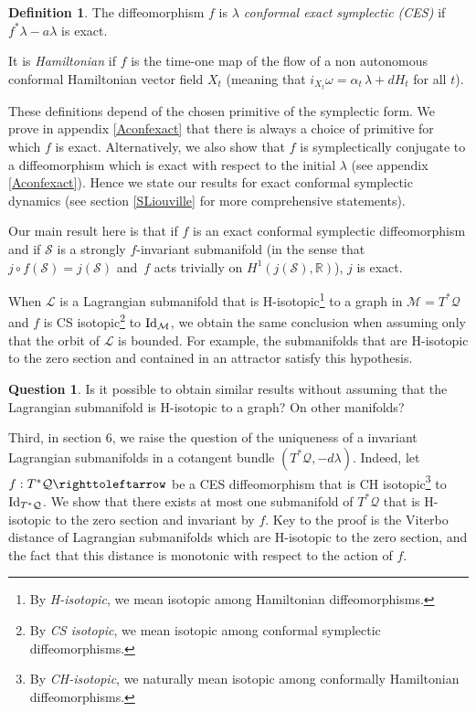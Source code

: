 \documentclass[10pt]{amsart}
\theoremstyle{definition}
\newtheorem{definition}[theorem]{Definition}
\newtheorem*{question*}{Question}
\def\R{\mathbb{R}}
\def\cL{{\mathcal L}}
\def\cM{{\mathcal M}}
\def\cQ{{\mathcal Q}}
\def\cS{{\mathcal S}}
\begin{document}
\begin{definition}
The diffeomorphism $f$ is \emph{$\lambda$ conformal exact symplectic (CES)} if $f^*\lambda-a\lambda$ is exact.

It is \emph{Hamiltonian} if $f$ is the time-one map of the flow of a non autonomous conformal Hamiltonian vector field $X_t$ (meaning that $i_{X_t}\omega = \alpha_t \, \lambda + dH_t$ for all $t$).
\end{definition}

These definitions depend of the chosen primitive of the symplectic form. We prove in appendix \ref{Aconfexact} that there is always a choice of primitive for which $f$ is exact. Alternatively, we also show that $f$ is symplectically conjugate to a diffeomorphism which is exact with respect to the initial $\lambda$ (see appendix \ref{Aconfexact}). Hence we state our results for exact conformal symplectic dynamics (see section \ref{SLiouville} for more comprehensive statements).

Our main result here is that if $f$ is an exact conformal symplectic diffeomorphism and if $\cS$ is a strongly $f$-invariant submanifold (in the sense that $j \circ f (\cS) = j(\cS)$ and~$f$ acts trivially on $H^1(j(\cS),\R)$), $j$ is exact.

When $\cL$ is a Lagrangian submanifold that is H-isotopic\footnote{By \emph{H-isotopic}, we mean isotopic among Hamiltonian diffeomorphisms.} to a graph in $\cM=T^*\cQ$ and $f$ is CS isotopic\footnote{By {\sl CS isotopic}, we mean isotopic among conformal symplectic diffeomorphisms.} to ${\rm Id}_\cM$, we obtain the same conclusion when assuming only that the orbit of $\cL$ is bounded. For example, the submanifolds that are H-isotopic to the zero section and contained in an attractor satisfy this hypothesis.

\begin{question*}
Is it possible to obtain similar results without assuming that the Lagrangian submanifold is H-isotopic to a graph? On other manifolds?
\end{question*}

Third, in section 6, we raise the question of the uniqueness of a invariant Lagrangian submanifolds in a cotangent bundle $(T^*\cQ, -d\lambda)$. Indeed, let $f:T^*\cQ \righttoleftarrow$ be a CES diffeomorphism that is CH isotopic\footnote{By \emph{CH-isotopic}, we naturally mean isotopic among conformally Hamiltonian diffeomorphisms.} to ${\rm Id}_{T^*\cQ}$. We show that there exists at most one submanifold of $T^*\cQ$ that is H-isotopic to the zero section and invariant by $f$. Key to the proof is the Viterbo distance of Lagrangian submanifolds which are H-isotopic to the zero section, and the fact that this distance is monotonic with respect to the action of $f$.
\end{document}

